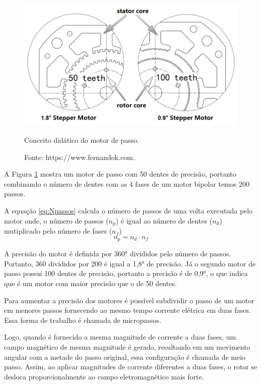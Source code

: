 \begin{figure}[H]
\centering
\includegraphics[width = 1\linewidth]{figuras/didaticopasso}
\caption{Conceito didático do motor de passo.}
\caption*{Fonte: https://www.fernandok.com.}
\label{fig:didaticopasso}
\end{figure}
    
A Figura \ref{fig:didaticopasso} mostra um motor de passo com 50 dentes de precisão, portanto combinando 
o número de dentes com as 4 fases de um motor bipolar temos 200 passos. 

A equação \ref{eq:Npassos} calcula o número de passos de uma volta executada pelo motor onde,
o número de passos ($n_{p}$) é igual ao número de dentes ($n_{d}$) mutiplicado pelo número de fases ($n_{f}$)
\begin{equation}\label{eq:Npassos}
    n_{p} = n_{d} \cdot n_{f}
\end{equation}

A precisão do motor é definida por 360° divididos pelo número de passos. Portanto, 
360 divididos por 200 é igual a 1,8° de precisão. Já o segundo motor 
de passo possui 100 dentes de precisão, portanto a precisão é de 0,9°, o que indica que 
é um motor com maior precisão que o de 50 dentes.

Para aumentar a precisão dos motores é possível subdividir o passo de um motor em menores passos fornecendo 
ao mesmo tempo corrente elétrica em duas fases. Essa forma de trabalho é chamada de micropassos.

Logo, quando é fornecido a mesma magnitude de corrente a duas fases, um campo magnético de mesma magnitude 
é gerado, resultando em um movimento angular com a metade do passo original, essa configuração é chamada de 
meio passo. Assim, ao aplicar magnitudes de corrente diferentes a duas fases, o rotor se desloca 
proporcionalmente ao campo eletromagnético mais forte.

